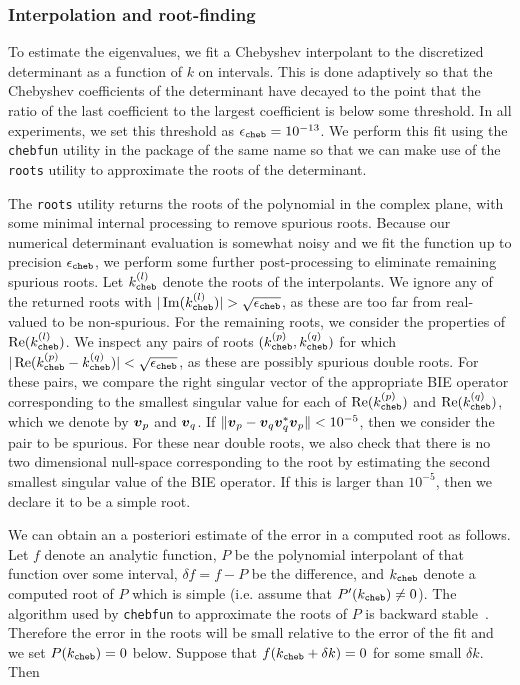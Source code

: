 \subsubsection{Interpolation and root-finding}

To estimate the eigenvalues, we fit a Chebyshev
interpolant to the discretized determinant as a
function of $k$ on intervals.
%
This is done adaptively so that the Chebyshev
coefficients of the determinant have decayed
to the point that the ratio of the last
coefficient to the largest coefficient is below
some threshold.
%
In all experiments, we set this threshold
as ${\epsilon_{\texttt{cheb}}} = 10^{-13}$.
%
We perform this fit using the \texttt{chebfun}
utility in the package of the same name
\cite{driscoll2014chebfun}
so that we can make use
of the \texttt{roots} utility to approximate
the roots of the determinant.

The \texttt{roots} utility returns the roots
of the polynomial in the complex plane, with
some minimal internal processing to remove
spurious roots.
%
Because our numerical determinant evaluation
is somewhat noisy and we fit the function up to
precision ${\epsilon_{\texttt{cheb}}}$, we perform some
further post-processing to eliminate remaining
spurious roots.
%
Let $k^{(l)}_{\texttt{cheb}}$ denote the roots of the interpolants.
%
We ignore any of the returned roots with $|\operatorname{Im}(k^{(l)}_{\texttt{cheb}})|
> \sqrt{{\epsilon_{\texttt{cheb}}}}$, as these are too far from real-valued
to be non-spurious.
%
For the remaining roots, we consider the
properties of $\operatorname{Re}(k^{(l)}_{\texttt{cheb}})$.
%
We inspect any pairs of roots $(k^{(p)}_{\texttt{cheb}},k^{(q)}_{\texttt{cheb}})$
for which $|\operatorname{Re}(k^{(p)}_{\texttt{cheb}}-k^{(q)}_{\texttt{cheb}})| < \sqrt{{\epsilon_{\texttt{cheb}}}}$,
as these are possibly spurious double roots.
%
For these pairs, we compare the right singular
vector of the appropriate BIE operator corresponding
to the smallest singular value for each of $\operatorname{Re}(k^{(p)}_{\texttt{cheb}})$
and $\operatorname{Re}(k^{(q)}_{\texttt{cheb}})$, which we denote by
${\boldsymbol v}_p$ and ${\boldsymbol v}_q$.
%
If $\|{\boldsymbol v}_p - {\boldsymbol v}_q {\boldsymbol v}_q^* {\boldsymbol v}_p \| < 10^{-5}$, then
we consider the pair to be spurious.
%
For these near double roots, we also check
that there is no two dimensional null-space
corresponding to the root by estimating the
second smallest singular value of the BIE operator.
%
If this is larger than $10^{-5}$, then we declare
it to be a simple root.

We can obtain an a posteriori estimate of the
error in a computed root as follows.
%
Let $f$ denote an analytic function,
$P$ be the polynomial interpolant
of that function over some interval,
$\delta f = f-P$ be the difference,
and $k_{\texttt{cheb}}$ denote a computed root
of $P$ which is simple (i.e. assume
that $P'(k_{\texttt{cheb}}) \ne 0$).
%
The algorithm used by \texttt{chebfun}
to approximate the roots of $P$ is
backward stable~\cite{noferini2017chebyshev}.
Therefore the error in the roots will be
small relative to the error of the fit and
we set $P(k_{\texttt{cheb}}) = 0$ below.
%
Suppose that
$f(k_{\texttt{cheb}} + \delta k) = 0$ for some
small $\delta k$. Then


